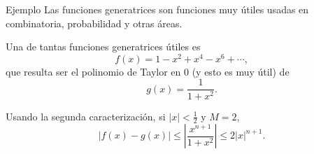 \begin{frame}{Ejemplo}
  Las funciones generatrices son funciones muy útiles usadas en
  combinatoria, probabilidad y otras áreas.

  Una de tantas funciones generatrices útiles es
  \[
    f(x) = 1 - x^2 + x^4 - x^6 + \cdots,
  \]
  que resulta ser el polinomio de Taylor en $0$ (y esto es muy útil) de
  \[
    g(x) = \frac{1}{1 + x^2}.
  \]

  Usando la segunda caracterización, si $\lvert x \rvert < \frac{1}{2}$ y
  $M = 2$,
  \[
    \lvert f(x) - g(x) \rvert 
    \leq \left\lvert \frac{x^{n + 1}}{1 + x^2} \right\rvert
    \leq 2 \lvert x \rvert^{n + 1}.
  \]
\end{frame}
